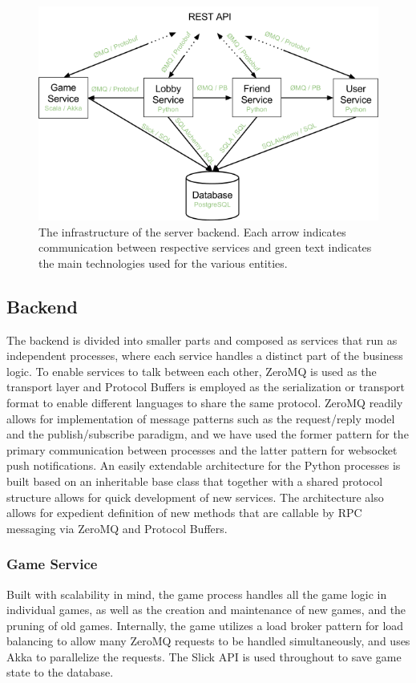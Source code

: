 \begin{figure}[H]
	\centering
	\includegraphics[width=\textwidth,height=\textheight,keepaspectratio=true]{img/sPVjzeXSLniaBJWqfNTsV4A.png}
	\caption{The infrastructure of the server backend. Each arrow indicates communication between respective services and green text indicates the main technologies used for the various entities.}
	\label{fig:sysarch}
\end{figure}

\subsection{Backend}
The backend is divided into smaller parts and composed as services that run as independent processes, where each service handles a distinct part of the business logic. To enable services to talk between each other, ZeroMQ is used as the transport layer and Protocol Buffers is employed as the serialization or transport format to enable different languages to share the same protocol. ZeroMQ readily allows for implementation of message patterns such as the request/reply model and the publish/subscribe paradigm, and we have used the former pattern for the primary communication between processes and the latter pattern for websocket push notifications.
An easily extendable architecture for the Python processes is built based on an inheritable base class that together with a shared protocol structure allows for quick development of new services. The architecture also allows for expedient definition of new methods that are callable by RPC messaging via ZeroMQ and Protocol Buffers. 

\subsubsection{Game Service}
Built with scalability in mind, the game process handles all the game logic in individual games, as well as the creation and maintenance of new games, and the pruning of old games. Internally, the game utilizes a load broker pattern for load balancing to allow many ZeroMQ requests to be handled simultaneously, and uses Akka to parallelize the requests. The Slick API is used throughout to save game state to the database.

